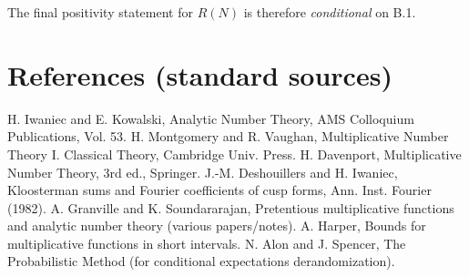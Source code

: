\documentclass[11pt]{article}
\theoremstyle{definition}
\theoremstyle{remark}
\begin{document}
The final positivity statement for $R(N)$ is therefore \emph{conditional} on B.1.

\section*{References (standard sources)}
H. Iwaniec and E. Kowalski, Analytic Number Theory, AMS Colloquium Publications, Vol. 53.  
H. Montgomery and R. Vaughan, Multiplicative Number Theory I. Classical Theory, Cambridge Univ. Press.  
H. Davenport, Multiplicative Number Theory, 3rd ed., Springer.  
J.-M. Deshouillers and H. Iwaniec, Kloosterman sums and Fourier coefficients of cusp forms, Ann. Inst. Fourier (1982).  
A. Granville and K. Soundararajan, Pretentious multiplicative functions and analytic number theory (various papers/notes).  
A. Harper, Bounds for multiplicative functions in short intervals.  
N. Alon and J. Spencer, The Probabilistic Method (for conditional expectations derandomization).
\end{document}
